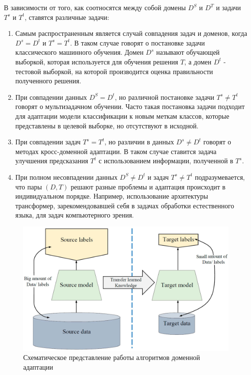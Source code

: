 В зависимости от того, как соотносятся между собой домены $D^S$ и $D^T$ и задачи $T^s$ и $T^t$, ставятся различные задачи:
\begin{enumerate}
\item Самым распространенным является случай совпадения задач и доменов, когда $D^s = D^t$ и $T^s = T^t$. В таком случае говорят о постановке задачи классического машинного обучения. Домен $D^s$ называют обучающей выборкой, которая используется для обучения решения $T$, а домен $D^t$ - тестовой выборкой, на которой производится оценка правильности полученного решения.

\item При совпадении данных $D^S = D^t$, но различной постановке задачи $T^s \ne T^t$ говорят о мультизадачном обучении. Часто такая постановка задачи подходит для адаптации модели классификации к новым меткам классов, которые представлены в целевой выборке, но отсутствуют в исходной.

\item При совпадении задач $T^s = T^t$, но различии в данных $D^s \ne D^t$ говорят о методах кросс-доменной адаптации. В таком случае ставится задача улучшения предсказания $T^t$ с использованием информации, полученной в $T^s$. 

\item При полном несовпадении данных $D^S \ne D^t$ и задач $T^s \ne T^t$ подразумевается, что пары $(D, T)$ решают разные проблемы и адаптация происходит в индивидуальном порядке. Например, использование архитектуры трансформер, зарекомендовавшей себя в задачах обработки естественного языка, для задач компьютерного зрения.
\end{enumerate} 

\begin{figure}[h]
	\centering
	\includegraphics[width=.75\textwidth]{./images/tasks/DA.jpg}
	\caption{Схематическое представление работы алгоритмов доменной адаптации}
	\label{fig:DA}
\end{figure}

